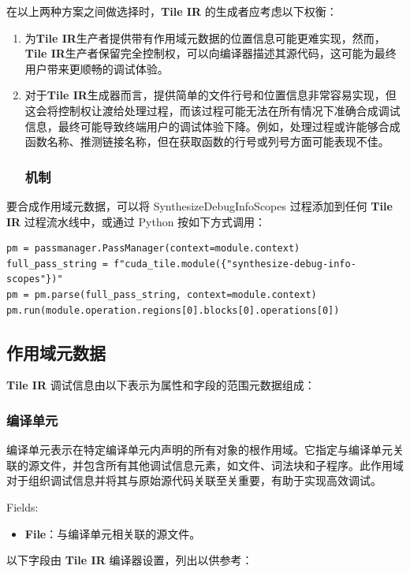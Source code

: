 \documentclass{article}
\begin{document}
在以上两种方案之间做选择时，\textbf{Tile IR} 的生成者应考虑以下权衡：



\begin{enumerate}
\item 为\textbf{Tile IR}生产者提供带有作用域元数据的位置信息可能更难实现，然而，\textbf{Tile IR}生产者保留完全控制权，可以向编译器描述其源代码，这可能为最终用户带来更顺畅的调试体验。
\item 对于\textbf{Tile IR}生成器而言，提供简单的文件行号和位置信息非常容易实现，但这会将控制权让渡给处理过程，而该过程可能无法在所有情况下准确合成调试信息，最终可能导致终端用户的调试体验下降。例如，处理过程或许能够合成函数名称、推测链接名称，但在获取函数的行号或列号方面可能表现不佳。




\subsubsection{机制}

\end{enumerate}
要合成作用域元数据，可以将 SynthesizeDebugInfoScopes 过程添加到任何 \textbf{Tile IR} 过程流水线中，或通过 Python 按如下方式调用：


\begin{lstlisting}
pm = passmanager.PassManager(context=module.context)
full_pass_string = f"cuda_tile.module({"synthesize-debug-info-scopes"})"
pm = pm.parse(full_pass_string, context=module.context)
pm.run(module.operation.regions[0].blocks[0].operations[0])
\end{lstlisting}


\subsection{作用域元数据}

\textbf{Tile IR} 调试信息由以下表示为属性和字段的范围元数据组成：


\subsubsection{编译单元}

编译单元表示在特定编译单元内声明的所有对象的根作用域。它指定与编译单元关联的源文件，并包含所有其他调试信息元素，如文件、词法块和子程序。此作用域对于组织调试信息并将其与原始源代码关联至关重要，有助于实现高效调试。


Fields:

\begin{itemize}
\item \textbf{File}：与编译单元相关联的源文件。

\end{itemize}
以下字段由 \textbf{Tile IR} 编译器设置，列出以供参考：
\end{document}
